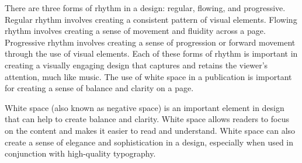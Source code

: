 \documentclass{report}
\begin{document}
    \bigbreak \noindent \bigbreak \noindent 
    \bigbreak \noindent 
    \bigbreak \noindent 
    There are three forms of rhythm in a design: regular, flowing, and progressive.
    Regular rhythm involves creating a consistent pattern of visual elements.
    Flowing rhythm involves creating a sense of movement and fluidity across a page.
    Progressive rhythm involves creating a sense of progression or forward movement through the use of visual elements.
    Each of these forms of rhythm is important in creating a visually engaging design that captures and retains the viewer's attention, much like music.
    The use of white space in a publication is important for creating a sense of balance and clarity on a page.
    
    \bigbreak \noindent \bigbreak \noindent 
    \bigbreak \noindent 
    \bigbreak \noindent 
    White space (also known as negative space) is an important element in design that can help to create balance and clarity.
    White space allows readers to focus on the content and makes it easier to read and understand.
    White space can also create a sense of elegance and sophistication in a design, especially when used in conjunction with high-quality typography.
    
    
    
\end{document}
